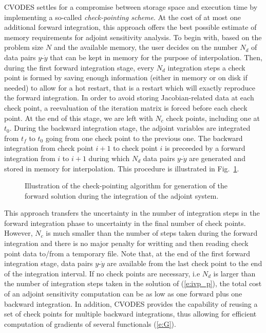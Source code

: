 CVODES settles for a compromise between storage space and execution time by
implementing a so-called {\em check-pointing scheme}. At the cost of
at most one additional forward integration, this approach offers the best possible 
estimate of memory requirements for adjoint sensitivity analysis. To begin with,
based on the problem size $N$ and the available memory, the user decides on 
the number $N_d$ of data pairs $y$-${\dot y}$ that can be kept in memory for 
the purpose of interpolation. Then, during the first forward integration stage, 
every $N_d$ integration steps a check point is formed by saving enough information
(either in memory or on disk if needed) to allow for a hot restart, that is a restart
which will exactly reproduce the forward integration. In order to avoid storing
Jacobian-related data at each check point, a reevaluation of the iteration matrix
is forced before each check point. At the end of this stage, we are left with $N_c$ 
check points, including one at $t_0$.
During the backward integration stage, the adjoint variables are integrated
from $t_f$ to $t_0$ going from one check point to the previous one.
The backward integration from check point $i+1$ to check point $i$ is preceeded
by a forward integration from $i$ to $i+1$ during which $N_d$ data pairs 
$y$-${\dot y}$ are generated and stored in memory for interpolation.
%
This procedure is illustrated in Fig.~\ref{f:ckpnt}.
%
\begin{figure}
\centerline{}
\caption {Illustration of the check-pointing algorithm for generation of 
  the forward solution during the integration of the adjoint system.}
\label{f:ckpnt}
\end{figure}

This approach transfers the uncertainty in the number of integration
steps in the forward integration phase to uncertainty in the final number of check 
points. However, $N_c$ is much smaller than the number of steps taken during
the forward integration and there is no major penalty for writting and then reading
check point data to/from a temporary file.
%
Note that, at the end of the first forward integration stage, data pairs 
$y$-${\dot y}$ are available from the last check point to the end of the integration 
interval. If no check points are necessary, i.e $N_d$ is larger than the 
number of integration steps taken in the solution of (\ref{e:ivp_p}),
the total cost of an adjoint sensitivity computation can be as low as one forward
plus one backward integration.
%
In addition, CVODES provides the capability of reusing a set of check points
for multiple backward integrations, thus allowing for efficient computation of
gradients of several functionals (\ref{e:G}).

